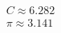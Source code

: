 \documentclass[preview]{standalone}
\begin{document}
\begin{align*}
C \approx 6.282 \\\pi \approx 3.141
\end{align*}
\end{document}
